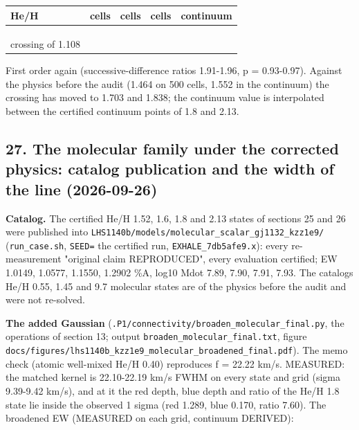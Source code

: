 \documentclass[english,a4paper]{my_memo}
\begin{document}
{\def\LTcaptype{none} %
{\small
\begin{longtable}[]{@{}>{\raggedright\arraybackslash}p{\dimexpr(\linewidth-10\tabcolsep)/5\relax}>{\raggedright\arraybackslash}p{\dimexpr(\linewidth-10\tabcolsep)/5\relax}>{\raggedright\arraybackslash}p{\dimexpr(\linewidth-10\tabcolsep)/5\relax}>{\raggedright\arraybackslash}p{\dimexpr(\linewidth-10\tabcolsep)/5\relax}>{\raggedright\arraybackslash}p{\dimexpr(\linewidth-10\tabcolsep)/5\relax}@{}}
\toprule\noalign{}
He/H & 500 cells & 1000 cells & 2000 cells & continuum \\
\midrule\noalign{}
\endhead
\bottomrule\noalign{}
\endlastfoot
1.6 & 1.0577 & 1.0297 & 1.0150 & 0.999 \\
1.8 & 1.1550 & 1.1249 & 1.1094 & 1.093 \\
2.13 & 1.2902 & 1.2571 & 1.2403 & 1.223 \\
crossing of 1.108 & 1.703 & 1.764 & 1.797 & 1.838 \\
\end{longtable}
}
}

First order again (successive-difference ratios 1.91-1.96, p = 0.93-0.97).
Against the physics before the audit (1.464 on 500 cells, 1.552 in the
continuum) the crossing has moved to 1.703 and 1.838; the continuum value is
interpolated between the certified continuum points of 1.8 and 2.13.

\subsection{27. The molecular family under the corrected physics: catalog publication and the width of the line (2026-09-26)}\label{27-the-molecular-family-under-the-corrected-physics-catalog-publication-and-the-width-of-the-line-2026-09-26}

\textbf{Catalog.} The certified He/H 1.52, 1.6, 1.8 and 2.13 states of sections 25
and 26 were published into \texttt{LHS1140b/models/molecular\_scalar\_gj1132\_kzz1e9/}
(\texttt{run\_case.sh}, \texttt{SEED=} the certified run, \texttt{EXHALE\_7db5afe9.x}): every re-
measurement "original claim REPRODUCED", every evaluation certified; EW 1.0149,
1.0577, 1.1550, 1.2902 \%A, log10 Mdot 7.89, 7.90, 7.91, 7.93. The catalog\textquotesingle s
He/H 0.55, 1.45 and 9.7 molecular states are of the physics before the audit
and were not re-solved.

\textbf{The added Gaussian} (\texttt{.P1/connectivity/broaden\_molecular\_final.py}, the
operations of section 13; output \texttt{broaden\_molecular\_final.txt}, figure
\texttt{docs/figures/lhs1140b\_kzz1e9\_molecular\_broadened\_final.pdf}). The memo check
(atomic well-mixed He/H 0.40) reproduces f = 22.22 km/s. MEASURED: the matched
kernel is 22.10-22.19 km/s FWHM on every state and grid (sigma 9.39-9.42
km/s), and at it the red depth, blue depth and ratio of the He/H 1.8 state
lie inside the observed 1 sigma (red 1.289, blue 0.170, ratio 7.60). The
broadened EW (MEASURED on each grid, continuum DERIVED):
\end{document}
